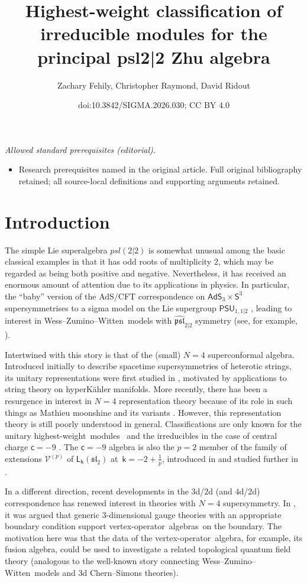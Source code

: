 \documentclass[10pt,a4paper]{amsart}
\title{Highest-weight classification of irreducible modules for the principal psl2|2 Zhu algebra}
\author{Zachary Fehily, Christopher Raymond, David Ridout}
\date{doi:10.3842/SIGMA.2026.030; CC BY 4.0}
\numberwithin{equation}{section}
\newcommand{\cc}{\mathsf{c}} %
\newcommand{\kk}{\mathsf{k}} %
\newcommand{\alg}[1]{\mathfrak{#1}} %
\newcommand{\grp}[1]{\mathsf{#1}} %
\newcommand{\VOA}[1]{\mathsf{#1}} %
\newcommand{\affine}[1]{\widehat{#1}}
\newcommand{\SLA}[2]{\alg{#1}_{#2}} %
\newcommand{\SLSA}[3]{\alg{#1}_{#2 \vert #3}} %
\newcommand{\AKMSA}[3]{\affine{\alg{#1}}_{#2 \vert #3}} %
\newcommand{\sltwo}{\SLA{sl}{2}}
\newcommand{\psl}{\SLSA{psl}{2}{2}}
\newcommand{\apsl}{\AKMSA{psl}{2}{2}}
\newcommand{\saff}[2]{\VOA{L}_{#1}(#2)} %
\newcommand{\ssl}[1][\kk]{\saff{#1}{\sltwo}} %
\newcommand{\wzw}{Wess--Zumino--Witten}
\newcommand{\hw}{highest-weight}
\newcommand{\hwm}{\hw\ module}
\newcommand{\hwms}{\hwm s}
\newcommand{\vo}{vertex-operator}
\newcommand{\voa}{\vo\ algebra}
\newcommand{\voas}{\voa s}
\def\smash#1{#1}
\def\psl{psl(2|2)}
\begin{document}
\maketitle
\noindent\textit{Allowed standard prerequisites (editorial).}\begin{itemize}
\item Research prerequisites named in the original article. Full original bibliography retained; all source-local definitions and supporting arguments retained.
\end{itemize}\medskip
\section{Introduction}

The simple Lie superalgebra \smash{$\psl$} is somewhat unusual among the basic classical examples in that it has odd roots of multiplicity $2$, which may be regarded as being both positive and negative.
Nevertheless, it has received an enormous amount of attention due to its applications in physics.
In particular, the ``baby'' version of the AdS/CFT correspondence on $\grp{AdS}_3 \times \grp{S}^3$ supersymmetrises to a sigma model on the Lie supergroup \smash{$\grp{PSU}_{1,1\vert2}$} \cite{BerCon99}, leading to interest in \wzw\ models with \smash{$\apsl$} symmetry (see, for example, \cite{EbeWor18,FerL1p24,GabMas11,GabU2223,GotWZN06,TroMas11}).

Intertwined with this story is that of the (small) $N=4$ superconformal algebra.
Introduced initially to describe spacetime supersymmetries of heterotic strings, its unitary representations were first studied in \cite{EguUni87}, motivated by applications to string theory on hyperK\"{a}hler manifolds.
More recently, there has been a resurgence in interest in $N=4$ representation theory because of its role in such things as Mathieu moonshine and its variants \cite{EguNot10}.
However, this representation theory is still poorly understood in general.
Classifications are only known for the unitary \hwms\ \cite{KacUni22,KacSpe25} and the irreducibles in the case of central charge $\cc=-9$ \cite{AdaRea14}.
The $\cc= -9$ algebra is also the $p=2$ member of the family of extensions $\mathcal{V}^{(p)}$ of $\ssl$ at~${\kk=-2+\frac{1}{p}}$, introduced in \cite{AdaRea14} and studied further in \cite{AdaVer20}.

In a different direction, recent developments in the $3$d/$2$d (and $4$d/$2$d) correspondence has renewed interest in theories with $N=4$ supersymmetry.
In \cite{CosVer18}, it was argued that generic $3$-dimensional gauge theories with an appropriate boundary condition support \voas\ on the boundary.
The motivation here was that the data of the \voa, for example, its fusion algebra, could be used to investigate a related topological quantum field theory (analogous to the well-known story connecting \wzw\ models and $3$d Chern--Simons theories).
\end{document}
